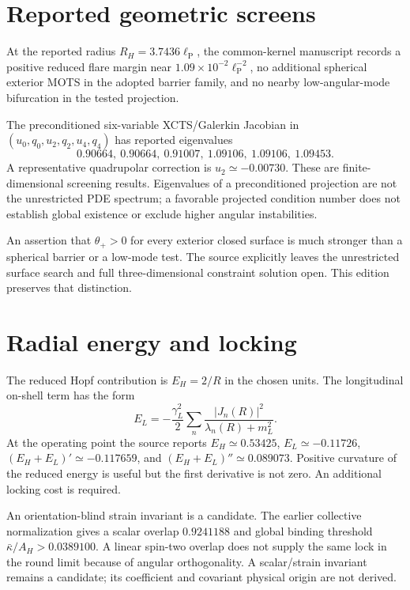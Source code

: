 \documentclass[11pt,oneside]{report}
\newcommand{\lp}{\ell_{\mathrm P}}
\begin{document}
\section{Reported geometric screens}
At the reported radius $R_H=3.7436\lp$, the common-kernel manuscript records a positive reduced flare margin near $1.09\times10^{-2}\lp^{-2}$, no additional spherical exterior MOTS in the adopted barrier family, and no nearby low-angular-mode bifurcation in the tested projection.

The preconditioned six-variable XCTS/Galerkin Jacobian in $(u_0,q_0,u_2,q_2,u_4,q_4)$ has reported eigenvalues
\begin{equation}
0.90664,\ 0.90664,\ 0.91007,\ 1.09106,\ 1.09106,\ 1.09453.
\end{equation}
A representative quadrupolar correction is $u_2\simeq-0.00730$. These are finite-dimensional screening results. Eigenvalues of a preconditioned projection are not the unrestricted PDE spectrum; a favorable projected condition number does not establish global existence or exclude higher angular instabilities.

An assertion that $\theta_+>0$ for every exterior closed surface is much stronger than a spherical barrier or a low-mode test. The source explicitly leaves the unrestricted surface search and full three-dimensional constraint solution open. This edition preserves that distinction.

\section{Radial energy and locking}
The reduced Hopf contribution is $E_H=2/R$ in the chosen units. The longitudinal on-shell term has the form
\begin{equation}
E_L=-\frac{\gamma_L^2}{2}\sum_n\frac{|J_n(R)|^2}{\lambda_n(R)+m_L^2}.
\end{equation}
At the operating point the source reports $E_H\simeq0.53425$, $E_L\simeq-0.11726$, $(E_H+E_L)'\simeq-0.117659$, and $(E_H+E_L)''\simeq0.089073$. Positive curvature of the reduced energy is useful but the first derivative is not zero. An additional locking cost is required.

An orientation-blind strain invariant is a candidate. The earlier collective normalization gives a scalar overlap $0.9241188$ and global binding threshold $\bar\kappa/A_H>0.0389100$. A linear spin-two overlap does not supply the same lock in the round limit because of angular orthogonality. A scalar/strain invariant remains a candidate; its coefficient and covariant physical origin are not derived.
\end{document}
